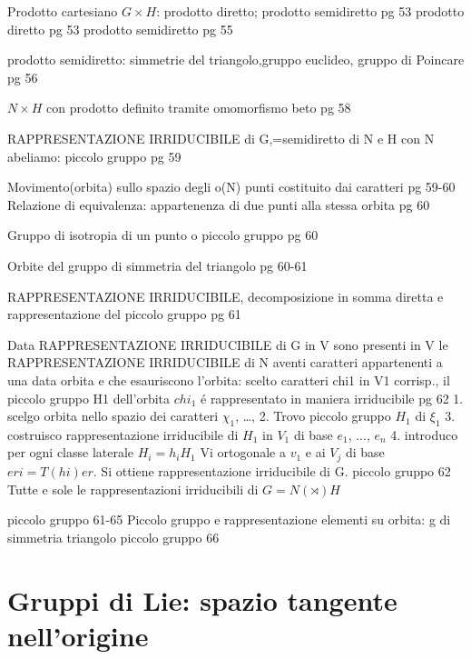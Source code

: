 \documentclass[oneside,12pt]{memoir}
\begin{document}
\begin{itemize*}
\item Prodotto cartesiano $G\times H$: prodotto diretto; prodotto semidiretto pg 53
prodotto diretto pg 53
prodotto semidiretto pg 55
\item prodotto semidiretto: simmetrie del triangolo,gruppo euclideo, gruppo di Poincare pg 56
\item $N\times H$ con prodotto definito tramite omomorfismo beto pg 58
\item RAPPRESENTAZIONE IRRIDUCIBILE di G,=semidiretto di N e H con N abeliamo: piccolo gruppo pg 59
\item Movimento(orbita) sullo spazio degli o(N) punti costituito dai caratteri pg 59-60
Relazione di equivalenza: appartenenza di due punti alla stessa orbita pg 60
\item Gruppo di isotropia di un punto o piccolo gruppo pg 60
\item Orbite del gruppo di simmetria del triangolo pg 60-61
\item RAPPRESENTAZIONE IRRIDUCIBILE, decomposizione in somma diretta e rappresentazione del piccolo gruppo pg 61
\item Data RAPPRESENTAZIONE IRRIDUCIBILE di G in V sono presenti in V le RAPPRESENTAZIONE IRRIDUCIBILE di N aventi caratteri appartenenti a una data orbita e che esauriscono l'orbita: scelto caratteri chi1 in V1 corrisp., il piccolo gruppo  H1 dell'orbita $chi_1$ \'e rappresentato in maniera irriducibile pg 62
1. scelgo orbita nello spazio dei caratteri $\chi_1$, \ldots, 2. Trovo piccolo gruppo  $H_1$ di $\xi_1$ 3. costruisco rappresentazione irriducibile di $H_1$ in $V_1$ di base $e_1$, ..., $e_n$ 4. introduco per ogni classe laterale $H_i=h_iH_1$  Vi ortogonale a $v_1$ e ai $V_j$ di base $eri=T(hi)er$. Si ottiene rappresentazione irriducibile di G. piccolo gruppo 62
Tutte e sole le rappresentazioni irriducibili di $G=N(\rtimes)H$
\item piccolo gruppo 61-65
Piccolo gruppo e rappresentazione elementi su orbita: g di simmetria triangolo piccolo gruppo 66
\end{itemize*}

\section{Gruppi di Lie: spazio tangente nell'origine}
\end{document}
